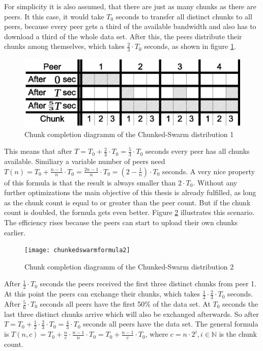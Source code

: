 For simplicity it is also assumed, that there are just as many chunks as there are peers. It this case, it would take $T_0$ seconds to transfer all distinct chunks to all peers, because every peer gets a third of the available bandwidth and also has to download a third of the whole data set. After this, the peers distribute their chunks among themselves, which takes $\frac{2}{3} \cdot T_0$ seconds, as shown in figure \ref{fig:chunkedswarmformula1}.

\begin{figure}[H]
\centering
\includegraphics[width=12cm]{chunkedswarmformula1}
\caption{Chunk completion diagramm of the Chunked-Swarm distribution 1}
\label{fig:chunkedswarmformula1}
\end{figure}

This means that after $T = T_0 + \frac{2}{3} \cdot T_0 = \frac{5}{3} \cdot T_0$ seconds every peer has all chunks available. Similiary a variable number of peers need $T(n) = T_0 + \frac{n - 1}{n} \cdot T_0 = \frac{2n - 1}{n} \cdot T_0 = (2 - \frac{1}{n}) \cdot T_0$ seconds. A very nice property of this formula is that the result is always smaller than $2 \cdot T_0$. Without any further optimizations the main objective of this thesis is already fulfilled, as long as the chunk count is equal to or greater than the peer count. But if the chunk count is doubled, the formula gets even better. Figure \ref{fig:chunkedswarmformula2} illustrates this scenario. The efficiency rises because the peers can start to upload their own chunks earlier.

\begin{figure}[H]
\centering
\texttt{[image: chunkedswarmformula2]}
\caption{Chunk completion diagramm of the Chunked-Swarm distribution 2}
\label{fig:chunkedswarmformula2}
\end{figure}

After $\frac{1}{2} \cdot T_0$ seconds the peers received the first three distinct chunks from peer 1. At this point the peers can exchange their chunks, which takes $\frac{1}{2} \cdot \frac{2}{3} \cdot T_0$ seconds. After $\frac{5}{6} \cdot T_0$ seconds all peers have the first 50\% of the data set. At $T_0$ seconds the last three distinct chunks arrive which will also be exchanged afterwards. So after $T = T_0 + \frac{1}{2} \cdot \frac{2}{3} \cdot T_0 = \frac{4}{3} \cdot T_0$ seconds all peers have the data set. The general formula is $T(n, c) = T_0 + \frac{n}{c} \cdot \frac{n-1}{n} \cdot T_0 =  T_0 + \frac{n-1}{c} \cdot T_0$, where $c = n \cdot 2^i, i \in \mathbb{N}$ is the chunk count.

